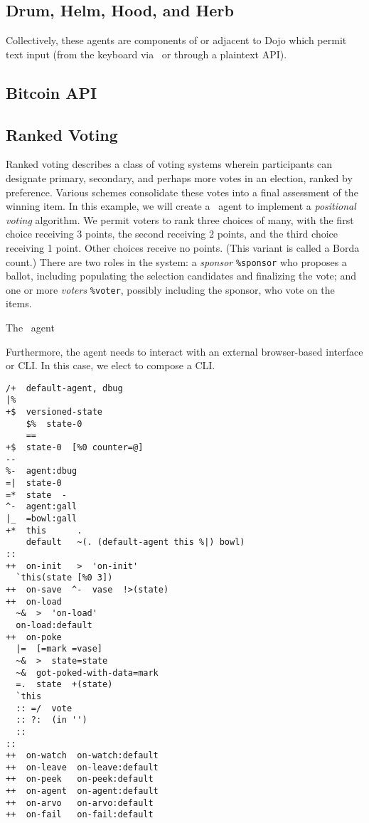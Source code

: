 \subsection{Drum, Helm, Hood, and Herb}

Collectively, these agents are components of or adjacent to Dojo which permit text input (from the keyboard via \dill~or through a plaintext API).

\subsection{Bitcoin API}

\subsection{Ranked Voting}

Ranked voting describes a class of voting systems wherein participants can designate primary, secondary, and perhaps more votes in an election, ranked by preference.  Various schemes consolidate these votes into a final assessment of the winning item.  In this example, we will create a \gall~agent to implement a \emph{positional voting} algorithm.  We permit voters to rank three choices of many, with the first choice receiving 3 points, the second receiving 2 points, and the third choice receiving 1 point.  Other choices receive no points.  (This variant is called a Borda count.)  There are two roles in the system:  a \emph{sponsor} \texttt{\%sponsor} who proposes a ballot, including populating the selection candidates and finalizing the vote; and one or more \emph{voters} \texttt{\%voter}, possibly including the sponsor, who vote on the items.

\begin{example}

The \gall~agent

Furthermore, the agent needs to interact with an external browser-based interface or CLI.  In this case, we elect to compose a CLI.

\begin{lstlisting}
/+  default-agent, dbug
|%
+$  versioned-state
    $%  state-0
    ==
+$  state-0  [%0 counter=@]
--
%-  agent:dbug
=|  state-0
=*  state  -
^-  agent:gall
|_  =bowl:gall
+*  this      .
    default   ~(. (default-agent this %|) bowl)
::
++  on-init   >  'on-init'
  `this(state [%0 3])
++  on-save  ^-  vase  !>(state)
++  on-load
  ~&  >  'on-load'
  on-load:default
++  on-poke
  |=  [=mark =vase]
  ~&  >  state=state
  ~&  got-poked-with-data=mark
  =.  state  +(state)
  `this
  :: =/  vote
  :: ?:  (in '')
  ::
::
++  on-watch  on-watch:default
++  on-leave  on-leave:default
++  on-peek   on-peek:default
++  on-agent  on-agent:default
++  on-arvo   on-arvo:default
++  on-fail   on-fail:default
\end{lstlisting}

\end{example}


